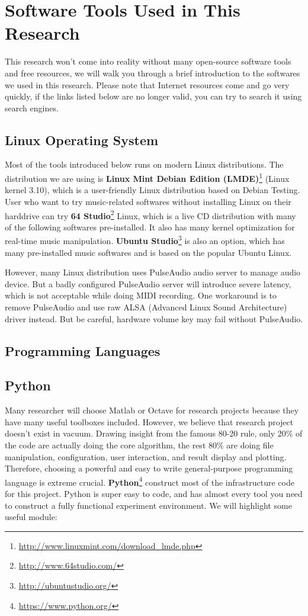 \chapter{Software Tools Used in This Research} \label{chap:sw} 
This research won't come into reality without many open-source software tools and free resources, we will walk you through a brief introduction to the softwares we used in this research. Please note that Internet resources come and go very quickly, if the links listed below are no longer valid, you can try to search it using search engines.
\section*{Linux Operating System}
Most of the tools introduced below runs on modern Linux distributions. The distribution we are using is \textbf{Linux Mint Debian Edition (LMDE)}\footnote{\url{http://www.linuxmint.com/download_lmde.php}} (Linux kernel 3.10), which is a user-friendly Linux distribution based on Debian Testing. User who want to try music-related softwares without installing Linux on their harddrive can try \textbf{64 Studio}\footnote{\url{http://www.64studio.com/}} Linux, which is a live CD distribution with many of the following softwares pre-installed. It also has many kernel optimization for real-time music manipulation. \textbf{Ubuntu Studio}\footnote{\url{http://ubuntustudio.org/}} is also an option, which has many pre-installed music softwares and is based on the popular Ubuntu Linux.

However, many Linux distribution uses PulseAudio audio server to manage audio device. But a badly configured PulseAudio server will introduce severe latency, which is not acceptable while doing MIDI recording. One workaround is to remove PulseAudio and use raw ALSA (Advanced Linux Sound Architecture) driver instead. But be careful, hardware volume key may fail without PulseAudio. 

\section*{Programming Languages}
   \section*{Python}
   Many researcher will choose Matlab or Octave for research projects because they have many useful toolboxes included. However, we believe that research project doesn't exist in vacuum. Drawing insight from the famous 80-20 rule, only 20\% of the code are actually doing the core algorithm, the rest 80\% are doing file manipulation, configuration, user interaction, and result display and plotting. Therefore, choosing a powerful and easy to write general-purpose programming language is extreme crucial. \textbf{Python}\footnote{\url{https://www.python.org/}} construct most of the infrastructure code for this project. Python is super easy to code, and has almost every tool you need to construct a fully functional experiment environment. We will highlight some useful module:
